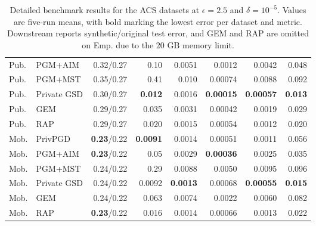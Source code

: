 \begin{table}[!tbp]
{\begin{tabular}{llrrrrrr}
    Pub. & PGM+AIM & 0.32/0.27 & 0.10 & 0.0051 & 0.0012 & 0.0042 & 0.048 \\
    Pub. & PGM+MST & 0.35/0.27 & 0.41 & 0.010 & 0.00074 & 0.0088 & 0.092 \\
    Pub. & Private GSD & 0.30/0.27 & \textbf{0.012} & 0.0016 & \textbf{0.00015} & \textbf{0.00057} & \textbf{0.013} \\
    Pub. & GEM & 0.29/0.27 & 0.035 & 0.0031 & 0.00042 & 0.0019 & 0.029 \\
    Pub. & RAP & 0.29/0.27 & 0.020 & 0.0015 & 0.00054 & 0.0012 & 0.020 \\
    \midrule
    Mob. & PrivPGD & \textbf{0.23}/0.22 & \textbf{0.0091} & 0.0014 & 0.00051 & 0.0011 & 0.056 \\
    Mob. & PGM+AIM & \textbf{0.23}/0.22 & 0.05 & 0.0029 & \textbf{0.00036} & 0.0025 & 0.035 \\
    Mob. & PGM+MST & 0.24/0.22 & 0.29 & 0.0088 & 0.0050 & 0.0095 & 0.096 \\
    Mob. & Private GSD & 0.24/0.22 & 0.0092 & \textbf{0.0013} & 0.00068 & \textbf{0.00055} & \textbf{0.015} \\
    Mob. & GEM & 0.24/0.22 & 0.063 & 0.0074 & 0.0022 & 0.0060 & 0.082 \\
    Mob. & RAP & \textbf{0.23}/0.22 & 0.016 & 0.0014 & 0.00066 & 0.0013 & 0.022 \\
    \bottomrule
  \end{tabular}}
  \caption{Detailed benchmark results for the ACS datasets at \(\epsilon = 2.5\) and \(\delta = 10^{-5}\). Values are five-run means, with bold marking the lowest error per dataset and metric. Downstream reports synthetic/original test error, and GEM and RAP are omitted on Emp. due to the \(20\) GB memory limit.}
  \label{tab:app-privpgd-e25-acs}
\end{table}

